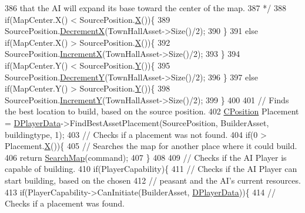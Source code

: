 \begin{DoxyCode}
386 \textcolor{comment}{            that the AI will expand its base toward the center of the map.}
387 \textcolor{comment}{        */}
388         \textcolor{keywordflow}{if}(MapCenter.X() < SourcePosition.\hyperlink{classCPosition_a9a6b94d3b91df1492d166d9964c865fc}{X}())\{
389             SourcePosition.\hyperlink{classCPosition_a64f0d8ef8ca26c8b66b0997b3b132416}{DecrementX}(TownHallAsset->Size()/2);   
390         \}
391         \textcolor{keywordflow}{else} \textcolor{keywordflow}{if}(MapCenter.X() > SourcePosition.\hyperlink{classCPosition_a9a6b94d3b91df1492d166d9964c865fc}{X}())\{
392             SourcePosition.\hyperlink{classCPosition_aa5955d67d5ab7ca74d80cb7303b6eaa9}{IncrementX}(TownHallAsset->Size()/2);
393         \}
394         \textcolor{keywordflow}{if}(MapCenter.Y() < SourcePosition.\hyperlink{classCPosition_a1aa8a30e2f08dda1f797736ba8c13a87}{Y}())\{
395             SourcePosition.\hyperlink{classCPosition_a51ee44d9e0457d6277567fd8a66fdec7}{DecrementY}(TownHallAsset->Size()/2);   
396         \}
397         \textcolor{keywordflow}{else} \textcolor{keywordflow}{if}(MapCenter.Y() > SourcePosition.\hyperlink{classCPosition_a1aa8a30e2f08dda1f797736ba8c13a87}{Y}())\{
398             SourcePosition.\hyperlink{classCPosition_a3f2a26798bb27b1252ff1be303b3adfc}{IncrementY}(TownHallAsset->Size()/2);
399         \}
400 
401         \textcolor{comment}{// Finds the best location to build, based on the source position.}
402         \hyperlink{classCPosition}{CPosition} Placement = \hyperlink{classCAIPlayer_a83b5113c8f7e80df54940b647c5ee2e6}{DPlayerData}->FindBestAssetPlacement(SourcePosition, 
      BuilderAsset, buildingtype, 1);
403         \textcolor{comment}{// Checks if a placement was not found.}
404         \textcolor{keywordflow}{if}(0 > Placement.\hyperlink{classCPosition_a9a6b94d3b91df1492d166d9964c865fc}{X}())\{
405             \textcolor{comment}{// Searches the map for another place where it could build.}
406             \textcolor{keywordflow}{return} \hyperlink{classCAIPlayer_afafbe8fc589e09a16ae1f02f2794d7b0}{SearchMap}(command);
407         \}
408 
409         \textcolor{comment}{// Checks if the AI Player is capable of building.}
410         \textcolor{keywordflow}{if}(PlayerCapability)\{
411             \textcolor{comment}{// Checks if the AI Player can start building, based on the chosen}
412             \textcolor{comment}{// peasant and the AI's current resources.}
413             \textcolor{keywordflow}{if}(PlayerCapability->CanInitiate(BuilderAsset, \hyperlink{classCAIPlayer_a83b5113c8f7e80df54940b647c5ee2e6}{DPlayerData}))\{
414                 \textcolor{comment}{// Checks if a placement was found. }

\end{DoxyCode}
